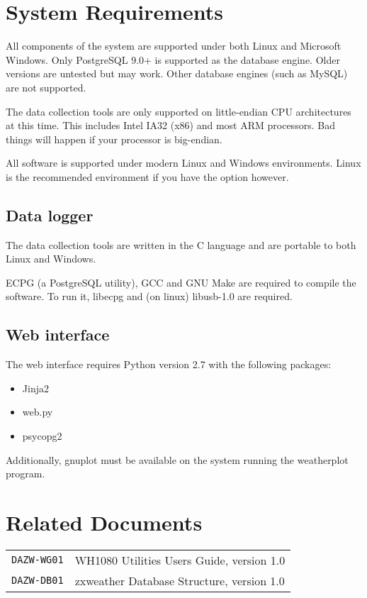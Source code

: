 \documentclass[a4paper,10pt,draft]{book}
\begin{document}
\section{System Requirements}
All components of the system are supported under both Linux and Microsoft Windows. Only PostgreSQL 9.0+ is supported as the database engine. Older versions are untested but may work. Other database engines (such as MySQL) are not supported.

The data collection tools are only supported on little-endian CPU architectures at this time. This includes Intel IA32 (x86) and most ARM processors. Bad things will happen if your processor is big-endian.

All software is supported under modern Linux and Windows environments. Linux is the recommended environment if you have the option however.

\subsection{Data logger}
The data collection tools are written in the C language and are portable to both Linux and Windows.

ECPG (a PostgreSQL utility), GCC and GNU Make are required to compile the software. To run it, libecpg and (on linux) libusb-1.0 are required.

\subsection{Web interface}
The web interface requires Python version 2.7 with the following packages:
\begin{itemize}
\item Jinja2
\item web.py
\item psycopg2
\end{itemize}

Additionally, gnuplot must be available on the system running the weatherplot program.

\section{Related Documents}
\begin{tabular}{l l}
\verb|DAZW-WG01| & WH1080 Utilities Users Guide, version 1.0 \\
\verb|DAZW-DB01| & zxweather Database Structure, version 1.0 \\
\end{tabular}
\end{document}

